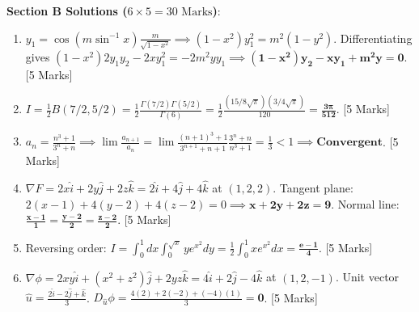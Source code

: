 \begin{solutionbox}
\medskip
\noindent\textbf{Section B Solutions ($6 \times 5 = 30\text{ Marks}$)}:
\begin{enumerate}[start=11]
    \item $y_1 = \cos(m\sin^{-1}x)\frac{m}{\sqrt{1-x^2}} \implies (1-x^2)y_1^2 = m^2(1-y^2)$. Differentiating gives $(1-x^2)2y_1 y_2 - 2x y_1^2 = -2m^2 y y_1 \implies \mathbf{(1-x^2)y_2 - xy_1 + m^2 y = 0}$. [5 Marks]
    \item $I = \frac{1}{2}B(7/2, 5/2) = \frac{1}{2}\frac{\Gamma(7/2)\Gamma(5/2)}{\Gamma(6)} = \frac{1}{2}\frac{(15/8\sqrt{\pi})(3/4\sqrt{\pi})}{120} = \mathbf{\frac{3\pi}{512}}$. [5 Marks]
    \item $a_n = \frac{n^3+1}{3^n+n} \implies \lim \frac{a_{n+1}}{a_n} = \lim \frac{(n+1)^3+1}{3^{n+1}+n+1}\frac{3^n+n}{n^3+1} = \frac{1}{3} < 1 \implies \mathbf{\text{Convergent}}$. [5 Marks]
    \item $\nabla F = 2x\hat{i} + 2y\hat{j} + 2z\hat{k} = 2\hat{i} + 4\hat{j} + 4\hat{k}$ at $(1,2,2)$. Tangent plane: $2(x-1) + 4(y-2) + 4(z-2) = 0 \implies \mathbf{x + 2y + 2z = 9}$. Normal line: $\mathbf{\frac{x-1}{1} = \frac{y-2}{2} = \frac{z-2}{2}}$. [5 Marks]
    \item Reversing order: $I = \int_0^1 dx \int_0^{\sqrt{x}} y e^{x^2} dy = \frac{1}{2}\int_0^1 x e^{x^2} dx = \mathbf{\frac{e-1}{4}}$. [5 Marks]
    \item $\nabla\phi = 2xy\hat{i} + (x^2+z^2)\hat{j} + 2yz\hat{k} = 4\hat{i} + 2\hat{j} - 4\hat{k}$ at $(1,2,-1)$. Unit vector $\hat{u} = \frac{2\hat{i}-2\hat{j}+\hat{k}}{3}$. $D_{\hat{u}}\phi = \frac{4(2) + 2(-2) + (-4)(1)}{3} = \mathbf{0}$. [5 Marks]
\end{enumerate}


\end{solutionbox}
